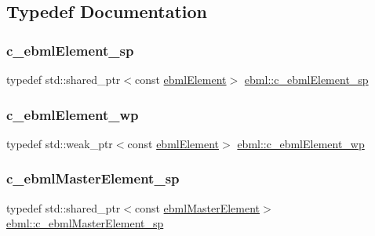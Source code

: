 \subsection{Typedef Documentation}
\mbox{\label{namespaceebml_a2deef4e8071531b32e3533f1bf978917}} 
\subsubsection{\texorpdfstring{c\+\_\+ebml\+Element\+\_\+sp}{c\_ebmlElement\_sp}}
{\footnotesize\ttfamily typedef std\+::shared\+\_\+ptr$<$const \mbox{\hyperlink{classebml_1_1ebmlElement}{ebml\+Element}}$>$ \mbox{\hyperlink{namespaceebml_a2deef4e8071531b32e3533f1bf978917}{ebml\+::c\+\_\+ebml\+Element\+\_\+sp}}}

\mbox{\label{namespaceebml_abc218c2fc1444b2fd8a8a5fae67e0151}} 
\subsubsection{\texorpdfstring{c\+\_\+ebml\+Element\+\_\+wp}{c\_ebmlElement\_wp}}
{\footnotesize\ttfamily typedef std\+::weak\+\_\+ptr$<$const \mbox{\hyperlink{classebml_1_1ebmlElement}{ebml\+Element}}$>$ \mbox{\hyperlink{namespaceebml_abc218c2fc1444b2fd8a8a5fae67e0151}{ebml\+::c\+\_\+ebml\+Element\+\_\+wp}}}

\mbox{\label{namespaceebml_a7a62721c59c06de6cadf348c51eabe1c}} 
\subsubsection{\texorpdfstring{c\+\_\+ebml\+Master\+Element\+\_\+sp}{c\_ebmlMasterElement\_sp}}
{\footnotesize\ttfamily typedef std\+::shared\+\_\+ptr$<$const \mbox{\hyperlink{classebml_1_1ebmlMasterElement}{ebml\+Master\+Element}}$>$ \mbox{\hyperlink{namespaceebml_a7a62721c59c06de6cadf348c51eabe1c}{ebml\+::c\+\_\+ebml\+Master\+Element\+\_\+sp}}}

